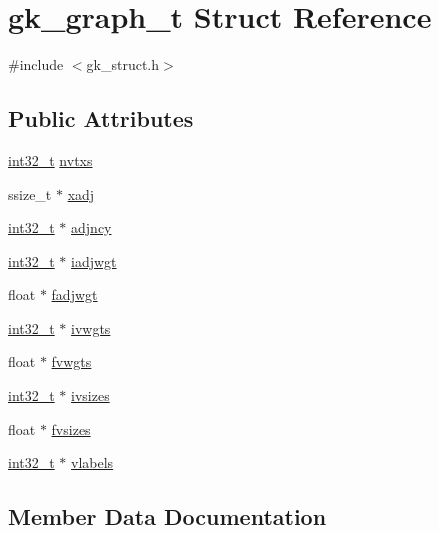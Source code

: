 \hypertarget{structgk__graph__t}{}\section{gk\+\_\+graph\+\_\+t Struct Reference}
\label{structgk__graph__t}


{\ttfamily \#include $<$gk\+\_\+struct.\+h$>$}

\subsection*{Public Attributes}
\begin{DoxyCompactItemize}
\item 
\hyperlink{ms__stdint_8h_a37994e3b11c72957c6f454c6ec96d43d}{int32\+\_\+t} \hyperlink{structgk__graph__t_adf27e7e36c8ba4cc586bd37b303db330}{nvtxs}
\item 
ssize\+\_\+t $\ast$ \hyperlink{structgk__graph__t_a4ab46970ef24e35f54e8ae6b3c15662f}{xadj}
\item 
\hyperlink{ms__stdint_8h_a37994e3b11c72957c6f454c6ec96d43d}{int32\+\_\+t} $\ast$ \hyperlink{structgk__graph__t_ac6f82b6550328643c2d64503e7349af4}{adjncy}
\item 
\hyperlink{ms__stdint_8h_a37994e3b11c72957c6f454c6ec96d43d}{int32\+\_\+t} $\ast$ \hyperlink{structgk__graph__t_aa5c9adf88207adf2bd0cc100042f335b}{iadjwgt}
\item 
float $\ast$ \hyperlink{structgk__graph__t_a96d4bbf3a3f9958549d53160d6f6d3aa}{fadjwgt}
\item 
\hyperlink{ms__stdint_8h_a37994e3b11c72957c6f454c6ec96d43d}{int32\+\_\+t} $\ast$ \hyperlink{structgk__graph__t_a25cd4970e41c3ee0bc919b93c9319023}{ivwgts}
\item 
float $\ast$ \hyperlink{structgk__graph__t_a900444f2ba7d2ecaf89591f85c849991}{fvwgts}
\item 
\hyperlink{ms__stdint_8h_a37994e3b11c72957c6f454c6ec96d43d}{int32\+\_\+t} $\ast$ \hyperlink{structgk__graph__t_af90840fb29404bc157231c3975dbc99f}{ivsizes}
\item 
float $\ast$ \hyperlink{structgk__graph__t_ab43a62e6f11f9cd20c5b6b7d3d02bb0e}{fvsizes}
\item 
\hyperlink{ms__stdint_8h_a37994e3b11c72957c6f454c6ec96d43d}{int32\+\_\+t} $\ast$ \hyperlink{structgk__graph__t_a720b0b3ecc66fcd7b1f3f280aaf074b4}{vlabels}
\end{DoxyCompactItemize}


\subsection{Member Data Documentation}
\mbox{\label{structgk__graph__t_ac6f82b6550328643c2d64503e7349af4}} 

